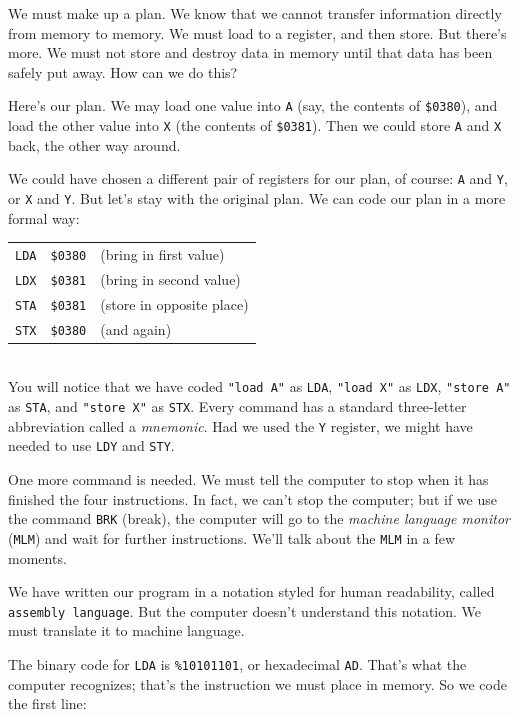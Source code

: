 \documentclass[11pt,a4paper,titlepage]{memoir}
\begin{document}
We must make up a plan. We know that we cannot transfer information
directly from memory to memory. We must load to a register, and then
store. But there's more. We must not store and destroy data in memory
until that data has been safely put away. How can we do this?

Here's our plan. We may load one value into \texttt{A} (say, the contents of
\texttt{\$0380}), and load the other value into \texttt{X} (the contents of \texttt{\$0381}). Then
we could store \texttt{A} and \texttt{X} back, the other way around.

We could have chosen a different pair of registers for our plan, of course:
\texttt{A} and \texttt{Y}, or \texttt{X} and \texttt{Y}. But let's stay with the original plan. We can code
our plan in a more formal way:\\

\begin{tabular}{lll}
	\texttt{LDA} & \texttt{\$0380} & (bring in first value)\\
	\texttt{LDX} & \texttt{\$0381} & (bring in second value)\\
	\texttt{STA} & \texttt{\$0381} & (store in opposite place)\\
	\texttt{STX} & \texttt{\$0380} & (and again)\\
\end{tabular}\\

You will notice that we have coded \texttt{"load A"} as \texttt{LDA}, \texttt{"load X"} as
\texttt{LDX}, \texttt{"store A"} as \texttt{STA}, and \texttt{"store X"} as \texttt{STX}. Every command
has a standard three-letter abbreviation called a \emph{mnemonic}. Had we used
the \texttt{Y} register, we might have needed to use \texttt{LDY} and \texttt{STY}.

One more command is needed. We must tell the computer to stop when
it has finished the four instructions. In fact, we can't stop the computer;
but if we use the command \texttt{BRK} (break), the computer will go to the
\emph{machine language monitor} (\texttt{MLM}) and wait for further instructions. We'll
talk about the \texttt{MLM} in a few moments.

We have written our program in a notation styled for human readability,
called \texttt{assembly language}. But the computer doesn't understand this notation. We must translate it to machine language.

The binary code for \texttt{LDA} is \texttt{\%10101101}, or hexadecimal \texttt{AD}. That's
what the computer recognizes; that's the instruction we must place in
memory. So we code the first line:\\
\end{document}

